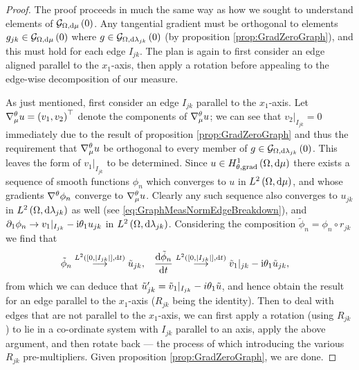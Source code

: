 \begin{proof}
	The proof proceeds in much the same way as how we sought to understand elements of $\mathcal{G}_{ \Omega, \mathrm{d}\mu}\left( 0 \right)$.
	Any tangential gradient must be orthogonal to elements $g_{jk}\in\mathcal{G}_{ \Omega, \mathrm{d}\mu}\left( 0 \right)$ where $g\in\mathcal{G}_{ \Omega, \mathrm{d}\lambda_{jk}}\left( 0 \right)$ (by proposition \ref{prop:GradZeroGraph}), and this must hold for each edge $I_{jk}$.
	The plan is again to first consider an edge aligned parallel to the $x_1$-axis, then apply a rotation before appealing to the edge-wise decomposition of our measure. \newline
	
	As just mentioned, first consider an edge $I_{jk}$ parallel to the $x_1$-axis. 
	Let $\nabla^{\theta}_\mu u = \left( v_1, v_2 \right)^\top$ denote the components of $\nabla^{\theta}_\mu u$; we can see that $v_2\vert_{I_{jk}}=0$ immediately due to the result of proposition \ref{prop:GradZeroGraph} and thus the requirement that $\nabla^{\theta}_\mu u$ be orthogonal to every member of $g\in\mathcal{G}_{ \Omega, \mathrm{d}\lambda_{jk}}\left( 0 \right)$.
	This leaves the form of $v_1\vert_{I_{jk}}$ to be determined.
	Since $u\in H^1_{\theta, \mathrm{grad}}\left( \Omega, \mathrm{d}\mu \right)$ there exists a sequence of smooth functions $\phi_n$ which converges to $u$ in $L^{2}\left( \Omega,\mathrm{d}\mu \right)$, and whose gradients $\nabla^{\theta}\phi_n$ converge to $\nabla^{\theta}_\mu u$.
	Clearly any such sequence also converges to $u_{jk}$ in $L^{2}\left( \Omega,\mathrm{d}\lambda_{jk} \right)$ as well (see \eqref{eq:GraphMeasNormEdgeBreakdown}), and $\partial_1\phi_n\rightarrow v_1\vert_{I_{jk}}-\mathrm{i}\theta_{1}u_{jk}$ in $L^{2}\left( \Omega,\mathrm{d}\lambda_{jk} \right)$.
	Considering the composition $\tilde{\phi}_n = \phi_n \circ r_{jk}$ we find that
	\begin{align*}
		\tilde{\phi}_n \overset{L^{2}\left( \left[ 0,\left\lvert I_{jk} \right\rvert \right],\mathrm{d}t \right)}{\longrightarrow} \tilde{u}_{jk},
		&\quad \dfrac{\mathrm{d}\tilde{\phi}_n}{\mathrm{d}t} \overset{L^{2}\left( \left[ 0,\left\lvert I_{jk} \right\rvert \right],\mathrm{d}t \right)}{\longrightarrow} \tilde{v}_1\vert_{jk} - \mathrm{i}\theta_1 \tilde{u}_{jk},
	\end{align*}
	from which we can deduce that $\tilde{u}_{jk}' = \tilde{v}_1\vert_{I_{jk}} - i\theta_1\tilde{u}$, and hence obtain the result for an edge parallel to the $x_1$-axis ($R_{jk}$ being the identity).
	Then to deal with edges that are not parallel to the $x_1$-axis, we can first apply a rotation (using $R_{jk}$) to lie in a co-ordinate system with $I_{jk}$ parallel to an axis, apply the above argument, and then rotate back --- the process of which introducing the various $R_{jk}$ pre-multipliers.
	Given proposition \ref{prop:GradZeroGraph}, we are done.
\end{proof}

